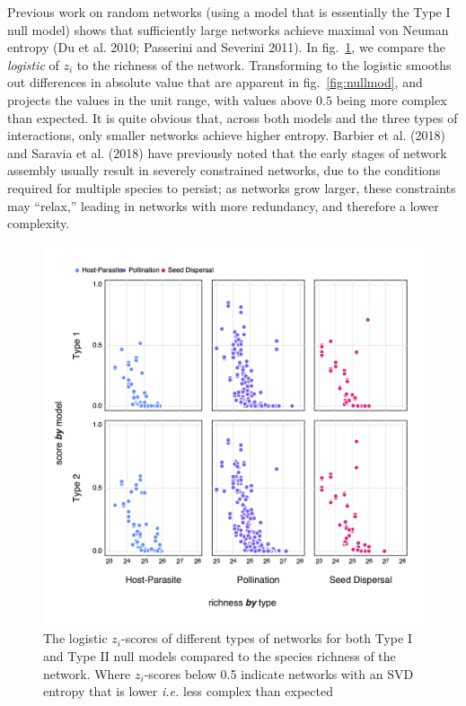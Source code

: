 \documentclass[10pt,oneside]{article}
\makeatletter
\def\maxwidth{\ifdim\Gin@nat@width>\linewidth\linewidth
\else\Gin@nat@width\fi}
\let\Oldincludegraphics\includegraphics
\renewcommand{\includegraphics}[1]{\Oldincludegraphics[width=\maxwidth]{#1}}
\makeatother
\begin{document}
Previous work on random networks (using a model that is essentially the
Type I null model) shows that sufficiently large networks achieve
maximal von Neuman entropy (Du et al. 2010; Passerini and Severini
2011). In fig.~\ref{fig:larger}, we compare the \emph{logistic} of
\(z_i\) to the richness of the network. Transforming to the logistic
smooths out differences in absolute value that are apparent in
fig.~\ref{fig:nullmod}, and projects the values in the unit range, with
values above \(0.5\) being more complex than expected. It is quite
obvious that, across both models and the three types of interactions,
only smaller networks achieve higher entropy. Barbier et al. (2018) and
Saravia et al. (2018) have previously noted that the early stages of
network assembly usually result in severely constrained networks, due to
the conditions required for multiple species to persist; as networks
grow larger, these constraints may ``relax,'' leading in networks with
more redundancy, and therefore a lower complexity.

\begin{figure}
\hypertarget{fig:larger}{%
\centering
\includegraphics{figures/nullmodel_richness.png}
\caption{The logistic \(z_i\)-scores of different types of networks for
both Type I and Type II null models compared to the species richness of
the network. Where \(z_i\)-scores below 0.5 indicate networks with an
SVD entropy that is lower \emph{i.e.} less complex than
expected}\label{fig:larger}
}
\end{figure}
\end{document}
